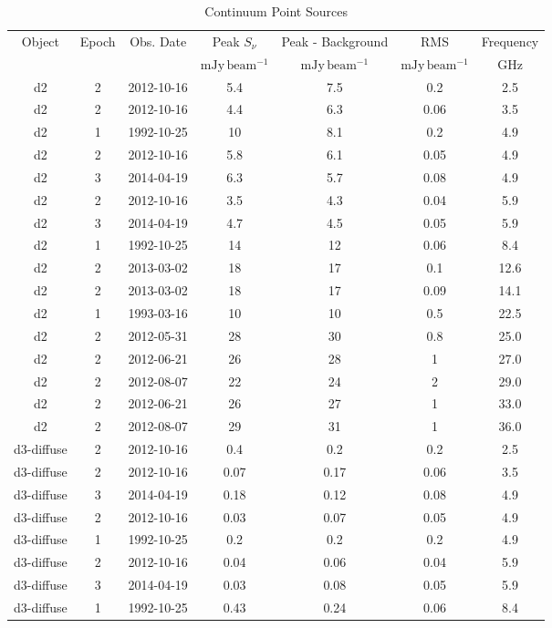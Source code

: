 \begin{table*}[htp]
\caption{Continuum Point Sources}
\begin{tabular}{ccccccc}
\label{tab:contsrcs_full}
Object & Epoch & Obs. Date & Peak $S_{\nu}$ & Peak - Background & RMS & Frequency \\
 &  &  & $\mathrm{mJy\,beam^{-1}}$ & $\mathrm{mJy\,beam^{-1}}$ & $\mathrm{mJy\,beam^{-1}}$ & $\mathrm{GHz}$ \\
\hline
d2 & 2 & 2012-10-16 & 5.4 & 7.5 & 0.2 & 2.5 \\
d2 & 2 & 2012-10-16 & 4.4 & 6.3 & 0.06 & 3.5 \\
d2 & 1 & 1992-10-25 & 10 & 8.1 & 0.2 & 4.9 \\
d2 & 2 & 2012-10-16 & 5.8 & 6.1 & 0.05 & 4.9 \\
d2 & 3 & 2014-04-19 & 6.3 & 5.7 & 0.08 & 4.9 \\
d2 & 2 & 2012-10-16 & 3.5 & 4.3 & 0.04 & 5.9 \\
d2 & 3 & 2014-04-19 & 4.7 & 4.5 & 0.05 & 5.9 \\
d2 & 1 & 1992-10-25 & 14 & 12 & 0.06 & 8.4 \\
d2 & 2 & 2013-03-02 & 18 & 17 & 0.1 & 12.6 \\
d2 & 2 & 2013-03-02 & 18 & 17 & 0.09 & 14.1 \\
d2 & 1 & 1993-03-16 & 10 & 10 & 0.5 & 22.5 \\
d2 & 2 & 2012-05-31 & 28 & 30 & 0.8 & 25.0 \\
d2 & 2 & 2012-06-21 & 26 & 28 & 1 & 27.0 \\
d2 & 2 & 2012-08-07 & 22 & 24 & 2 & 29.0 \\
d2 & 2 & 2012-06-21 & 26 & 27 & 1 & 33.0 \\
d2 & 2 & 2012-08-07 & 29 & 31 & 1 & 36.0 \\
d3-diffuse & 2 & 2012-10-16 & 0.4 & 0.2 & 0.2 & 2.5 \\
d3-diffuse & 2 & 2012-10-16 & 0.07 & 0.17 & 0.06 & 3.5 \\
d3-diffuse & 3 & 2014-04-19 & 0.18 & 0.12 & 0.08 & 4.9 \\
d3-diffuse & 2 & 2012-10-16 & 0.03 & 0.07 & 0.05 & 4.9 \\
d3-diffuse & 1 & 1992-10-25 & 0.2 & 0.2 & 0.2 & 4.9 \\
d3-diffuse & 2 & 2012-10-16 & 0.04 & 0.06 & 0.04 & 5.9 \\
d3-diffuse & 3 & 2014-04-19 & 0.03 & 0.08 & 0.05 & 5.9 \\
d3-diffuse & 1 & 1992-10-25 & 0.43 & 0.24 & 0.06 & 8.4 \\

\end{tabular}
\end{table*}

